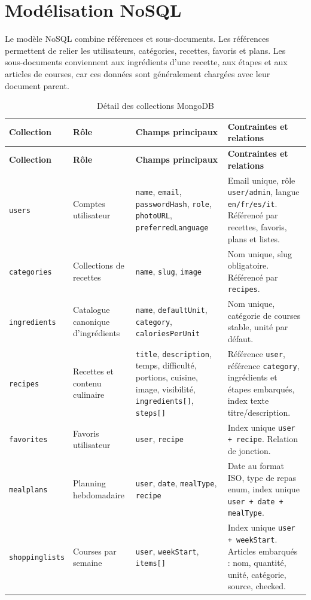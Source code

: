 \documentclass[12pt,a4paper]{report}
\begin{document}
\section{Modélisation NoSQL}
Le modèle NoSQL combine références et sous-documents. Les références permettent de relier les utilisateurs, catégories, recettes, favoris et plans. Les sous-documents conviennent aux ingrédients d'une recette, aux étapes et aux articles de courses, car ces données sont généralement chargées avec leur document parent.

\begin{longtable}{p{2.2cm}p{3.2cm}p{4.2cm}p{4.8cm}}
\caption{Détail des collections MongoDB}\label{tab:collections}\\
\toprule
\textbf{Collection} & \textbf{Rôle} & \textbf{Champs principaux} & \textbf{Contraintes et relations} \\
\midrule
\endfirsthead
\toprule
\textbf{Collection} & \textbf{Rôle} & \textbf{Champs principaux} & \textbf{Contraintes et relations} \\
\midrule
\endhead
\texttt{users} & Comptes utilisateur & \texttt{name}, \texttt{email}, \texttt{passwordHash}, \texttt{role}, \texttt{photoURL}, \texttt{preferredLanguage} & Email unique, rôle \texttt{user/admin}, langue \texttt{en/fr/es/it}. Référencé par recettes, favoris, plans et listes. \\
\texttt{categories} & Collections de recettes & \texttt{name}, \texttt{slug}, \texttt{image} & Nom unique, slug obligatoire. Référencé par \texttt{recipes}. \\
\texttt{ingredients} & Catalogue canonique d'ingrédients & \texttt{name}, \texttt{defaultUnit}, \texttt{category}, \texttt{caloriesPerUnit} & Nom unique, catégorie de courses stable, unité par défaut. \\
\texttt{recipes} & Recettes et contenu culinaire & \texttt{title}, \texttt{description}, temps, difficulté, portions, cuisine, image, visibilité, \texttt{ingredients[]}, \texttt{steps[]} & Référence \texttt{user}, référence \texttt{category}, ingrédients et étapes embarqués, index texte titre/description. \\
\texttt{favorites} & Favoris utilisateur & \texttt{user}, \texttt{recipe} & Index unique \texttt{user + recipe}. Relation de jonction. \\
\texttt{mealplans} & Planning hebdomadaire & \texttt{user}, \texttt{date}, \texttt{mealType}, \texttt{recipe} & Date au format ISO, type de repas enum, index unique \texttt{user + date + mealType}. \\
\texttt{shoppinglists} & Courses par semaine & \texttt{user}, \texttt{weekStart}, \texttt{items[]} & Index unique \texttt{user + weekStart}. Articles embarqués : nom, quantité, unité, catégorie, source, checked. \\
\bottomrule
\end{longtable}
\end{document}
